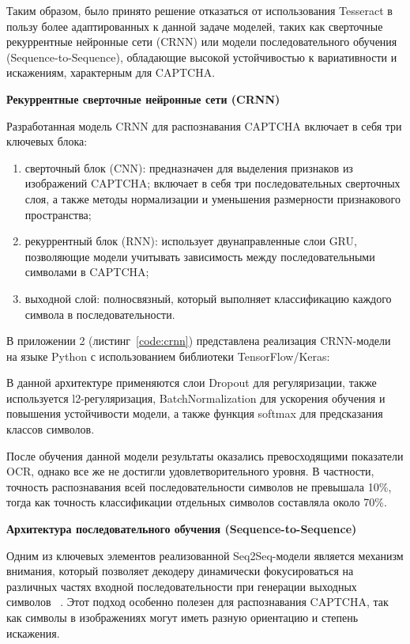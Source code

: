 Таким образом, было принято решение отказаться от использования Tesseract в 
пользу более адаптированных к данной задаче моделей, таких как сверточные 
рекуррентные нейронные сети (CRNN) или модели последовательного обучения 
(Sequence-to-Sequence), обладающие высокой устойчивостью к вариативности и 
искажениям, характерным для CAPTCHA.

\textbf{Рекуррентные сверточные нейронные сети (CRNN)}

Разработанная модель CRNN для распознавания CAPTCHA включает в себя три ключевых 
блока:

\begin{enumerate}
    \item сверточный блок (CNN): предназначен для выделения признаков из 
    изображений CAPTCHA; включает в себя три последовательных сверточных слоя, а 
    также методы нормализации и уменьшения размерности признакового пространства;
    \item рекуррентный блок (RNN): использует двунаправленные слои GRU, 
    позволяющие модели учитывать зависимость между последовательными символами в 
    CAPTCHA;
    \item выходной слой: полносвязный, который выполняет классификацию каждого 
    символа в последовательности.
\end{enumerate}

В приложении 2 (листинг~\ref{code:crnn}) представлена реализация CRNN-модели на 
языке Python с использованием библиотеки TensorFlow/Keras:

В данной архитектуре применяются слои Dropout для регуляризации, также 
используется l2-регуляризация, BatchNormalization для ускорения обучения и 
повышения устойчивости модели, а также функция softmax для предсказания классов 
символов.

После обучения данной модели результаты оказались превосходящими показатели OCR, 
однако все же не достигли удовлетворительного уровня. В частности, точность 
распознавания всей последовательности символов не превышала 10\%, тогда как 
точность классификации отдельных символов составляла около 70\%.

\textbf{Архитектура последовательного обучения (Sequence-to-Sequence)}

Одним из ключевых элементов реализованной Seq2Seq-модели является механизм 
внимания, который позволяет декодеру динамически фокусироваться на различных 
частях входной последовательности при генерации выходных символов~
\cite{seq2seqattention}. Этот подход особенно полезен для распознавания CAPTCHA, 
так как символы в изображениях могут иметь разную ориентацию и степень искажения.

